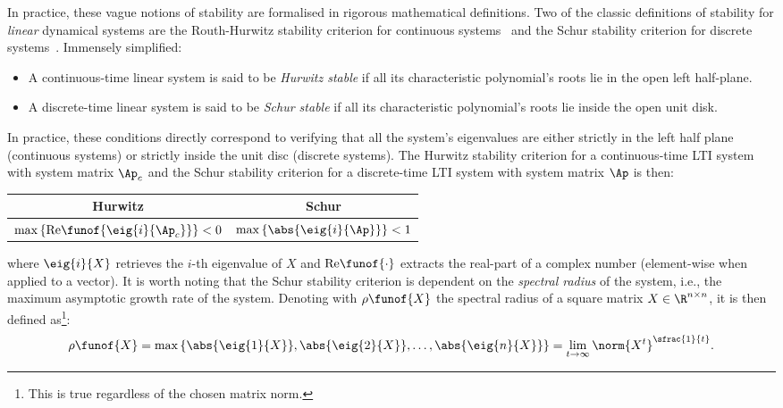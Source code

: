 In practice, these vague notions of stability are formalised in rigorous mathematical definitions.
Two of the classic definitions of stability for \emph{linear} dynamical systems are the Routh-Hurwitz stability criterion for continuous systems~\addref{} and the Schur stability criterion for discrete systems~\addref{}.
Immensely simplified:
%
\begin{itemize}
    \item A continuous-time linear system is said to be \emph{Hurwitz stable} if all its characteristic polynomial's roots lie in the open left half-plane.
    \item A discrete-time linear system is said to be \emph{Schur stable} if all its characteristic polynomial's roots lie inside the open unit disk.
\end{itemize}
%
In practice, these conditions directly correspond to verifying that all the system's eigenvalues are either strictly in the left half plane (continuous systems) or strictly inside the unit disc (discrete systems).
The Hurwitz stability criterion for a continuous-time LTI system with system matrix $\Ap_c$ and the Schur stability criterion for a discrete-time LTI system with system matrix $\Ap$ is then:
%
\begin{table}[h]
    \def\arraystretch{1.5}%
    \centering%
    \begin{tabular}{c|c}
        Hurwitz & Schur \\ \hline
        $\max{ \left\{ \mathrm{Re}\funof{\eig{i}{\Ap_c}} \right\}} < 0$ & $\max{ \left\{ \abs{\eig{i}{\Ap}} \right\}} < 1$
    \end{tabular}
\end{table}
%
\newline\noindent
where $\eig{i}{X}$ retrieves the $i$-th eigenvalue of $X$ and $\mathrm{Re}\funof{\cdot}$ extracts the real-part of a complex number (element-wise when applied to a vector).
It is worth noting that the Schur stability criterion is dependent on the \emph{spectral radius} of the system, i.e., the maximum asymptotic growth rate of the system.
Denoting with $\rho\funof{X}$ the spectral radius of a square matrix $X \in \R^{n \times n}$, it is then defined as\footnote{This is true regardless of the chosen matrix norm.}:
%
\begin{equation}%
    \label{eq:spectral-radius}%
    \rho\funof{X} = \max \left\{ \abs{\eig{1}{X}}, \abs{\eig{2}{X}}, \ldots, \abs{\eig{n}{X}} \right\} = \lim_{t\rightarrow\infty} \norm{X^t}^{\sfrac{1}{t}}.
\end{equation}

